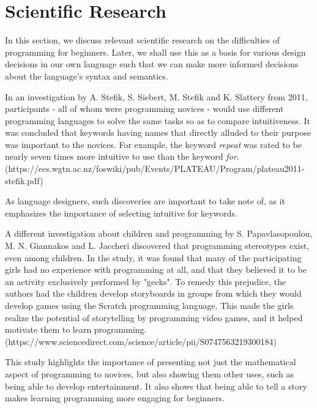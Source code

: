 \chapter{Scientific Research} \label{chap:analysis}
In this section, we discuss relevant scientific research on the difficulties of programming for beginners.
Later, we shall use this as a basis for various design decisions in our own language such that we can make more 
informed decisions about the language's syntax and semantics.

In an investigation by A. Stefik, S. Siebert, M. Stefik and K. Slattery from 2011, participants - all of whom were
programming novices - would use different programming languages to solve the same tasks so as to compare intuitiveness. 
It was concluded that keywords having names that directly alluded to their purpose was important to the novices. 
For example, the keyword \emph{repeat} was rated to be nearly seven times more intuitive to use than the keyword \emph{for}. 
(https://ecs.wgtn.ac.nz/foswiki/pub/Events/PLATEAU/Program/plateau2011-stefik.pdf)

As language designers, such discoveries are important to take note of, as it emphasizes the importance of selecting intuitive for keywords.

A different investigation about children and programming by S. Papavlasopoulou, M. N. Giannakos and L. Jaccheri discovered that programming
stereotypes exist, even among children. In the study, it was found that many of the participating girls had no experience with programming
at all, and that they believed it to be an activity exclusively performed by "geeks". To remedy this prejudice, the authors had the children
develop storyboards in groups from which they would develop games using the Scratch programming language. This made the girls realize
the potential of storytelling by programming video games, and it helped motivate them to learn programming.
(https://www.sciencedirect.com/science/article/pii/S0747563219300184)

This study highlights the importance of presenting not just the mathematical aspect of programming to novices, but also 
showing them other uses, such as being able to develop entertainment. 
It also shows that being able to tell a story makes learning programming more engaging for beginners.